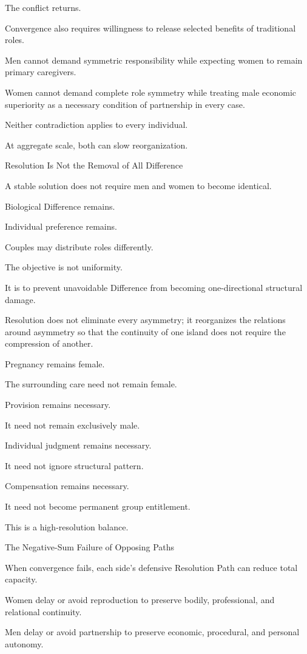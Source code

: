 The conflict returns.

Convergence also requires willingness to release selected benefits of traditional roles.

Men cannot demand symmetric responsibility while expecting women to remain primary caregivers.

Women cannot demand complete role symmetry while treating male economic superiority as a necessary condition of partnership in every case.

Neither contradiction applies to every individual.

At aggregate scale, both can slow reorganization.

Resolution Is Not the Removal of All Difference

A stable solution does not require men and women to become identical.

Biological Difference remains.

Individual preference remains.

Couples may distribute roles differently.

The objective is not uniformity.

It is to prevent unavoidable Difference from becoming one-directional structural damage.

Resolution does not eliminate every asymmetry; it reorganizes the relations around asymmetry so that the continuity of one island does not require the compression of another.

Pregnancy remains female.

The surrounding care need not remain female.

Provision remains necessary.

It need not remain exclusively male.

Individual judgment remains necessary.

It need not ignore structural pattern.

Compensation remains necessary.

It need not become permanent group entitlement.

This is a high-resolution balance.

The Negative-Sum Failure of Opposing Paths

When convergence fails, each side’s defensive Resolution Path can reduce total capacity.

Women delay or avoid reproduction to preserve bodily, professional, and relational continuity.

Men delay or avoid partnership to preserve economic, procedural, and personal autonomy.

